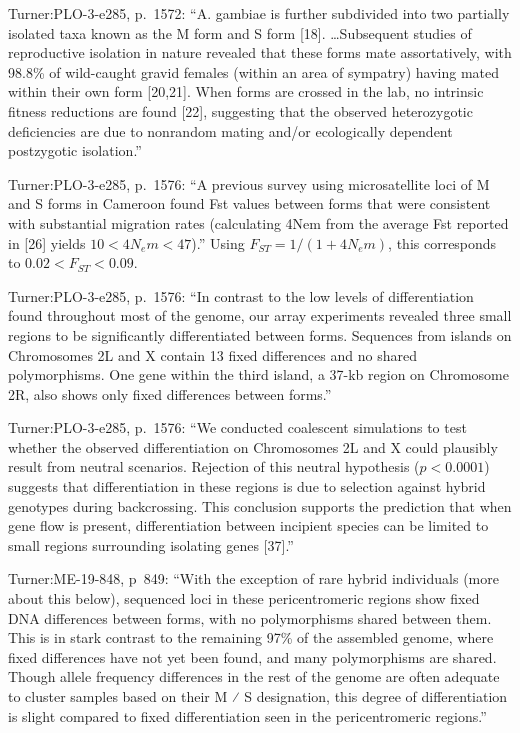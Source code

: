 \documentclass[11pt]{article}
\begin{document}
Turner:PLO-3-e285, p.~1572: ``A. gambiae is further subdivided into
two partially isolated taxa known as the M form and S form
[18]. \ldots Subsequent studies of reproductive isolation in nature
revealed that these forms mate assortatively, with 98.8\% of
wild-caught gravid females (within an area of sympatry) having mated
within their own form [20,21]. When forms are crossed in the lab, no
intrinsic fitness reductions are found [22], suggesting that the
observed heterozygotic deficiencies are due to nonrandom mating
and/or ecologically dependent postzygotic isolation.'' 

Turner:PLO-3-e285, p.~1576: ``A previous survey using microsatellite
loci of M and S forms in Cameroon found Fst values between forms
that were consistent with substantial migration rates (calculating
4Nem from the average Fst reported in [26] yields $10 < 4N_e m <
47$).'' Using $F_{ST} = 1/(1 + 4N_e m)$, this corresponds to $0.02 <
F_{ST} < 0.09$.

Turner:PLO-3-e285, p.~1576: ``In contrast to the low levels of
differentiation found throughout most of the genome, our array
experiments revealed three small regions to be significantly
differentiated between forms. Sequences from islands on Chromosomes
2L and X contain 13 fixed differences and no shared
polymorphisms. One gene within the third island, a 37-kb region on
Chromosome 2R, also shows only fixed differences between forms.''

Turner:PLO-3-e285, p.~1576: ``We conducted coalescent simulations to
test whether the observed differentiation on Chromosomes 2L and X
could plausibly result from neutral scenarios. Rejection of this
neutral hypothesis ($p < 0.0001$) suggests that differentiation in
these regions is due to selection against hybrid genotypes during
backcrossing. This conclusion supports the prediction that when gene
flow is present, differentiation between incipient species can be
limited to small regions surrounding isolating genes [37].''

Turner:ME-19-848, p~849: ``With the exception of rare hybrid
individuals (more about this below), sequenced loci in these
pericentromeric regions show fixed DNA differences between forms,
with no polymorphisms shared between them. This is in stark contrast
to the remaining 97\% of the assembled genome, where fixed
differences have not yet been found, and many polymorphisms are
shared. Though allele frequency differences in the rest of the
genome are often adequate to cluster samples based on their M ⁄ S
designation, this degree of differentiation is slight compared to
fixed differentiation seen in the pericentromeric regions.''
\end{document}
